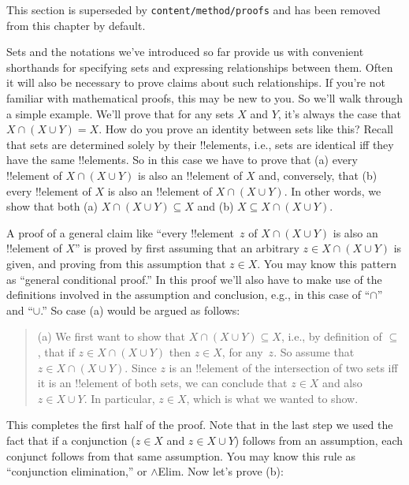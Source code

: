 \documentclass[../../../include/open-logic-section]{subfiles}
\begin{document}

\begin{editorial}
This section is superseded by \verb|content/method/proofs| and has
been removed from this chapter by default.
\end{editorial}

\begin{explain}
Sets and the notations we've introduced so far provide us with
convenient shorthands for specifying sets and expressing relationships
between them. Often it will also be necessary to prove claims about
such relationships. If you're not familiar with mathematical proofs,
this may be new to you. So we'll walk through a simple example. We'll
prove that for any sets $X$ and $Y$, it's always the case that $X \cap
(X \cup Y) = X$. How do you prove an identity between sets like this?
Recall that sets are determined solely by their !!{element}s, i.e.,
sets are identical iff they have the same !!{element}s. So in this
case we have to prove that (a) every !!{element} of $X \cap (X \cup
Y)$ is also an !!{element} of $X$ and, conversely, that (b) every
!!{element} of $X$ is also an !!{element} of $X \cap (X \cup Y)$. In
other words, we show that both (a) $X \cap (X \cup Y) \subseteq X$ and
(b) $X \subseteq X \cap (X \cup Y)$.

A proof of a general claim like ``every !!{element}~$z$ of $X \cap (X
\cup Y)$ is also an !!{element} of $X$'' is proved by first assuming
that an arbitrary $z \in X \cap (X \cup Y)$ is given, and proving from
this assumption that $z \in X$. You may know this pattern as ``general
conditional proof.''  In this proof we'll also have to make use of the
definitions involved in the assumption and conclusion, e.g., in this
case of ``$\cap$'' and ``$\cup$.''  So case (a) would be argued as
follows:

\begin{quote}
(a) We first want to show that $X \cap (X \cup Y) \subseteq X$, i.e.,
by definition of $\subseteq$, that if $z \in X \cap (X \cup Y)$ then
$z \in X$, for any~$z$. So assume that $z \in X \cap (X \cup
Y)$. Since $z$ is an !!{element} of the intersection of two sets iff
it is an !!{element} of both sets, we can conclude that $z \in X$ and
also $z \in X \cup Y$. In particular, $z \in X$, which is what
we wanted to show.
\end{quote}

This completes the first half of the proof. Note that in the last
step we used the fact that if a conjunction ($z \in X$ and $z \in X
\cup Y$) follows from an assumption, each conjunct follows from that
same assumption. You may know this rule as ``conjunction
elimination,'' or $\land$Elim. Now let's prove (b):


\end{explain}
\end{document}
